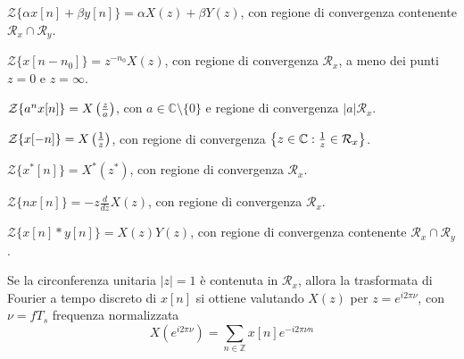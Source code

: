         \begin{property}[Linearità]
            $\mathcal{Z}\{\alpha x[n] + \beta y[n]\} = \alpha X(z) + \beta Y(z)$, con regione di convergenza contenente $\mathcal{R}_{x} \cap \mathcal{R}_{y}$.
        \end{property}

        \begin{property}[Traslazione]
            $\mathcal{Z}\{x[n - n_0]\} = z^{-n_0} X(z)$, con regione di convergenza $\mathcal{R}_{x}$, a meno dei punti $z = 0$ e $z = \infty$.
        \end{property}

        \begin{property}[Modulazione]
            $\mathcal{Z}\{a^n x[n]\} = X\qty(\frac{z}{a})$, con $a \in \mathbb{C} \setminus \{0\}$ e regione di convergenza $|a| \mathcal{R}_{x}$.
        \end{property}

        \begin{property}
            $\mathcal{Z}\{x[-n]\} = X\qty(\frac{1}{z})$, con regione di convergenza $\qty{ z \in \mathbb{C} \st \frac{1}{z} \in \mathcal{R}_{x} }$.
        \end{property}

        \begin{property}[Coniugazione]
            $\mathcal{Z}\{x^*[n]\} = X^*(z^*)$, con regione di convergenza $\mathcal{R}_{x}$.
        \end{property}

        \begin{property}
            $\mathcal{Z}\{n x[n]\} = -z \frac{d}{dz} X(z)$, con regione di convergenza $\mathcal{R}_{x}$.
        \end{property}

        \begin{property}[Convoluzione]
            $\mathcal{Z}\{x[n] * y[n]\} = X(z) Y(z)$, con regione di convergenza contenente $\mathcal{R}_{x} \cap \mathcal{R}_{y}$.
        \end{property}

        \begin{property}
            Se la circonferenza unitaria $|z| = 1$ è contenuta in $\mathcal{R}_{x}$, allora la trasformata di Fourier a tempo discreto di $x[n]$ si ottiene valutando $X(z)$ per $z = e^{i 2 \pi \nu}$, con $\nu = f T_s$ frequenza normalizzata
            \[
                X(e^{i 2 \pi \nu}) = \sum_{n \in \mathbb{Z}} x[n] e^{-i 2 \pi \nu n}
            \]
        \end{property}

